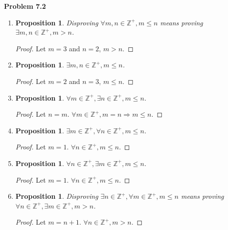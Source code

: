 \documentclass{article}
\newtheorem{prop}[thm]{Proposition}
\begin{document}
\textbf{Problem 7.2}
\begin{enumerate}[label={(\roman*)}]
    \item 
    \begin{prop}
        Disproving $\forall m, n \in \mathbb{Z^+}, m \le n$ means proving $\exists m, n \in \mathbb{Z^+}, m >n$.
    \end{prop}
    \begin{proof}
        Let $m=3$ and $n=2$, $m>n$.
    \end{proof}

    \item 
    \begin{prop}
        $\exists m,n \in \mathbb{Z^+}, m \le n$.
    \end{prop}
    \begin{proof}
        Let $m=2$ and $n=3$, $m \le n$.
    \end{proof}

    \item 
    \begin{prop}
        $\forall m \in \mathbb{Z^+}, \exists n \in \mathbb{Z^+}, m \le n$.
    \end{prop}
    \begin{proof}
        Let $n=m$. $\forall m \in \mathbb{Z^+}, m=n \Rightarrow m \le n$.
    \end{proof}

    \item 
    \begin{prop}
        $\exists m \in \mathbb{Z^+}, \forall n \in \mathbb{Z^+},  m \le n$.
    \end{prop}
    \begin{proof}
        Let $m = 1$. $\forall n \in \mathbb{Z^+}, m \le n $.
    \end{proof}

    \item 
    \begin{prop}
        $\forall n \in \mathbb{Z^+}, \exists m \in \mathbb{Z^+}, m \le n$.
    \end{prop}
    \begin{proof}
        Let $m = 1$. $\forall n \in \mathbb{Z^+}, m \le n$.
    \end{proof}

    \item 
    \begin{prop}
        Disproving $\exists n \in \mathbb{Z^+}, \forall m \in \mathbb{Z^+}, m \le n$ means proving $\forall n \in \mathbb{Z^+}, \exists m \in \mathbb{Z^+}, m > n$.
    \end{prop}
    \begin{proof}
        Let $m = n+1$. $\forall n \in \mathbb{Z^+}, m > n$.
    \end{proof}
\end{enumerate}
\bigbreak
\end{document}
